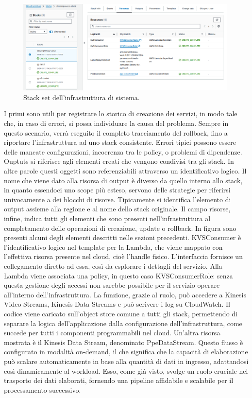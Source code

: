 \vspace{0.5cm}
\begin{figure}[htbp]
    \centering
    \includegraphics[width=0.99\textwidth]{figures/stack-set.png}
    \caption{Stack set dell'infrastruttura di sistema.} 
    \label{fig:stack-set}
\end{figure}

\newpage
I primi sono utili per registrare lo storico di creazione dei servizi, in modo tale che, in caso di errori, si possa individuare la causa del problema. Sempre in questo scenario, verrà eseguito il completo tracciamento del rollback, fino a riportare l'infrastruttura ad uno stack consistente. Errori tipici possono essere delle mancate configurazioni, incoerenza tra le policy, o problemi di dipendenze. Ouptuts si riferisce agli elementi creati che vengono condivisi tra gli stack. In altre parole questi oggetti sono referenziabili attraverso un identificativo logico. Il nome che viene dato alla risorsa di output è diverso da quello interno allo stack, in quanto essendoci uno scope più esteso, servono delle strategie per riferirsi univocamente a dei blocchi di risorse. Tipicamente si identifica l'elemento di output assieme alla regione e al nome dello stack originale. Il campo risorse, infine, indica tutti gli elementi che sono presenti nell'infrastruttura al completamento delle operazioni di creazione, update o rollback. In figura sono presenti alcuni degli elementi descritti nelle sezioni precedenti. KVSConsumer è l'identificativo logico nel template per la Lambda, che viene mappato con l'effettiva risorsa presente nel cloud, cioè l'handle fisico. L'interfaccia fornisce un collegamento diretto ad essa, così da esplorare i dettagli del servizio. Alla Lambda viene associata una policy, in questo caso KVSConsumerRole: senza questa gestione degli accessi non sarebbe possibile per il servizio operare all'interno dell'infrastruttura. La funzione, grazie al ruolo, può accedere a Kinesis Video Streams, Kinesis Data Streams e può scrivere i log su CloudWatch. Il codice viene caricato sull'object store comune a tutti gli stack, permettendo di separare la logica dell'applicazione dalla configurazione dell'infrastruttura, come succede per tutti i componenti programmabili nel cloud. Un'altra risorsa mostrata è il Kinesis Data Stream, denominato PpeDataStream. Questo flusso è configurato in modalità on-demand, il che significa che la capacità di elaborazione può scalare automaticamente in base alla quantità di dati in ingresso, adattandosi così dinamicamente al workload. Esso, come già visto, svolge un ruolo cruciale nel trasporto dei dati elaborati, fornendo una pipeline affidabile e scalabile per il processamento successivo. 
 

